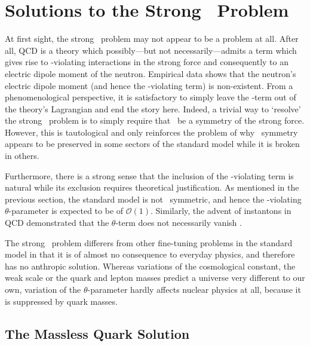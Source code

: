\chapter{Solutions to the Strong \CP\ Problem}

At first sight, the strong \CP\ problem may not appear to be a problem at all.
After all, QCD is a theory which possibly---but not necessarily---admits a term which gives rise to \CP-violating interactions in the strong force and consequently to an electric dipole moment of the neutron.
Empirical data shows that the neutron's electric dipole moment (and hence the \CP-violating term) is non-existent.
From a phenomenological perspective, it is satisfactory to simply leave the \CP-term out of the theory's Lagrangian and end the story here.
Indeed, a trivial way to `resolve' the strong \CP\ problem is to simply require that \CP\ be a symmetry of the strong force.
However, this is tautological and only reinforces the problem of why \CP\ symmetry appears to be preserved in some sectors of the standard model while it is broken in others.

Furthermore, there is a strong sense that the inclusion of the \CP-violating term is natural while its exclusion requires theoretical justification.
As mentioned in the previous section, the standard model is not \CP\ symmetric, and hence the \CP-violating $\theta$-parameter is expected to be of $\mathcal{O}(1)$.
Similarly, the advent of instantons in QCD demonstrated that the $\theta$-term does not necessarily vanish \cite{lectures-on-instantons,instantons-whats-happening}.

The strong \CP\ problem differers from other fine-tuning problems in the standard model  in that it is of almost no consequence to everyday physics, and therefore has no anthropic solution.
Whereas variations of the cosmological constant, the weak scale or the quark and lepton masses predict a universe very different to our own, variation of the $\theta$-parameter hardly affects nuclear physics at all, because it is suppressed by quark masses.




\section{The Massless Quark Solution}


